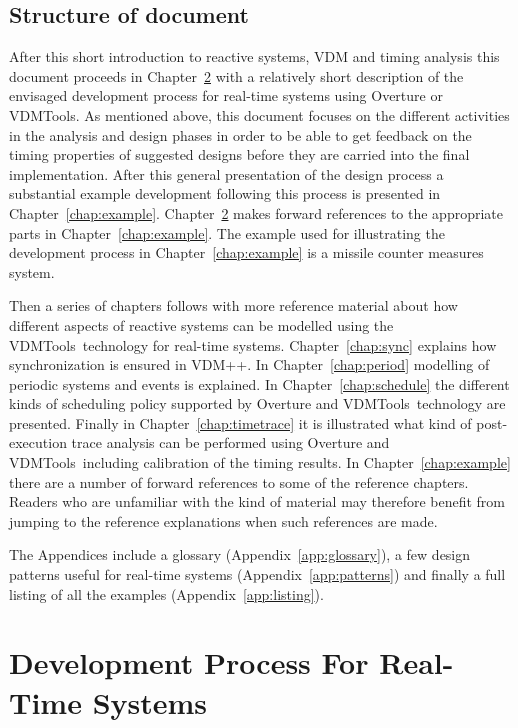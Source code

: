 \documentclass{overturerepchap}
\newcommand{\VDMTools}{VDMTools}
\begin{document}
\section{Structure of document}

After this short introduction to reactive systems, VDM and timing
analysis this document proceeds in Chapter~\ref{chap:process} with a
relatively short description of the envisaged development process for
real-time systems using Overture or 
\VDMTools. As mentioned above, this document
focuses on the different activities in the analysis and design phases
in order to be able to get feedback on the timing properties of
suggested designs before they are carried into the final
implementation. After this general presentation of the design process
a substantial example development following this process is presented
in Chapter~\ref{chap:example}. Chapter~\ref{chap:process} makes
forward references to the appropriate parts in
Chapter~\ref{chap:example}.  The example used for illustrating the
development process in Chapter~\ref{chap:example} is a missile counter
measures system.

Then a series of chapters follows with more reference material about
how different aspects of reactive systems can be modelled using the
\VDMTools\ technology for real-time systems. Chapter~\ref{chap:sync}
explains how synchronization is ensured in VDM++.  In
Chapter~\ref{chap:period} modelling of periodic systems and events is
explained. In Chapter~\ref{chap:schedule} the different
kinds of scheduling policy supported by Overture and \VDMTools\ technology are
presented. Finally in Chapter~\ref{chap:timetrace} it is illustrated
what kind of post-execution trace analysis can be performed using
Overture and
\VDMTools\ including calibration of the timing results. In
Chapter~\ref{chap:example} there are a number of forward references to
some of the reference chapters. Readers who are unfamiliar with the
kind of material may therefore benefit from jumping to the reference
explanations when such references are made.

The Appendices include a glossary (Appendix~\ref{app:glossary}), a few
design patterns useful for real-time systems
(Appendix~\ref{app:patterns}) and finally a full listing of all the
examples (Appendix~\ref{app:listing}).

\chapter{Development Process For Real-Time Systems}\label{chap:process}
\end{document}
